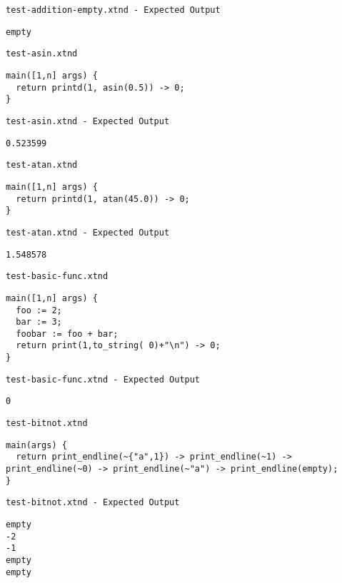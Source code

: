 \medskip \noindent \texttt{test-addition-empty.xtnd - Expected Output}


\begin{lstlisting}
empty
\end{lstlisting}


\medskip \noindent \texttt{test-asin.xtnd}


\begin{lstlisting}
main([1,n] args) {
  return printd(1, asin(0.5)) -> 0;
}
\end{lstlisting}


\medskip \noindent \texttt{test-asin.xtnd - Expected Output}


\begin{lstlisting}
0.523599
\end{lstlisting}


\medskip \noindent \texttt{test-atan.xtnd}


\begin{lstlisting}
main([1,n] args) {
  return printd(1, atan(45.0)) -> 0;
}
\end{lstlisting}


\medskip \noindent \texttt{test-atan.xtnd - Expected Output}


\begin{lstlisting}
1.548578
\end{lstlisting}


\medskip \noindent \texttt{test-basic-func.xtnd}


\begin{lstlisting}
main([1,n] args) {
  foo := 2;
  bar := 3;
  foobar := foo + bar;
  return print(1,to_string( 0)+"\n") -> 0;
}
\end{lstlisting}


\medskip \noindent \texttt{test-basic-func.xtnd - Expected Output}


\begin{lstlisting}
0
\end{lstlisting}


\medskip \noindent \texttt{test-bitnot.xtnd}


\begin{lstlisting}
main(args) {
  return print_endline(~{"a",1}) -> print_endline(~1) -> print_endline(~0) -> print_endline(~"a") -> print_endline(empty);
}
\end{lstlisting}


\medskip \noindent \texttt{test-bitnot.xtnd - Expected Output}


\begin{lstlisting}
empty
-2
-1
empty
empty
\end{lstlisting}


